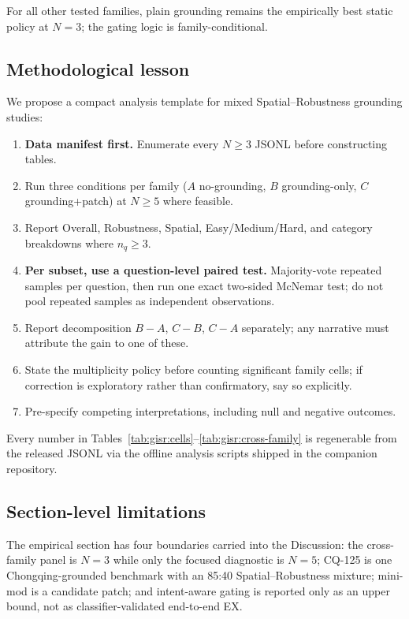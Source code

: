 For all other tested families, plain grounding remains the empirically best static policy at $N{=}3$; the gating logic is family-conditional.

\subsection{Methodological lesson}
\label{sec:gisr:methodology}

We propose a compact analysis template for mixed Spatial--Robustness grounding studies:

\begin{enumerate}[itemsep=1pt,leftmargin=*]
\item \textbf{Data manifest first.} Enumerate every $N{\geq}3$ JSONL before constructing tables.
\item Run three conditions per family ($A$ no-grounding, $B$ grounding-only, $C$ grounding+patch) at $N{\geq}5$ where feasible.
\item Report Overall, Robustness, Spatial, Easy/Medium/Hard, and category breakdowns where $n_q{\geq}3$.
\item \textbf{Per subset, use a question-level paired test.} Majority-vote repeated samples per question, then run one exact two-sided McNemar test; do not pool repeated samples as independent observations.
\item Report decomposition $B-A$, $C-B$, $C-A$ separately; any narrative must attribute the gain to one of these.
\item State the multiplicity policy before counting significant family cells; if correction is exploratory rather than confirmatory, say so explicitly.
\item Pre-specify competing interpretations, including null and negative outcomes.
\end{enumerate}

Every number in Tables~\ref{tab:gisr:cells}--\ref{tab:gisr:cross-family} is regenerable from the released JSONL via the offline analysis scripts shipped in the companion repository.

\subsection{Section-level limitations}
\label{sec:gisr:limitations}

The empirical section has four boundaries carried into the Discussion: the cross-family panel is $N{=}3$ while only the focused diagnostic is $N{=}5$; CQ-125 is one Chongqing-grounded benchmark with an 85:40 Spatial--Robustness mixture; mini-mod is a candidate patch; and intent-aware gating is reported only as an upper bound, not as classifier-validated end-to-end EX.

